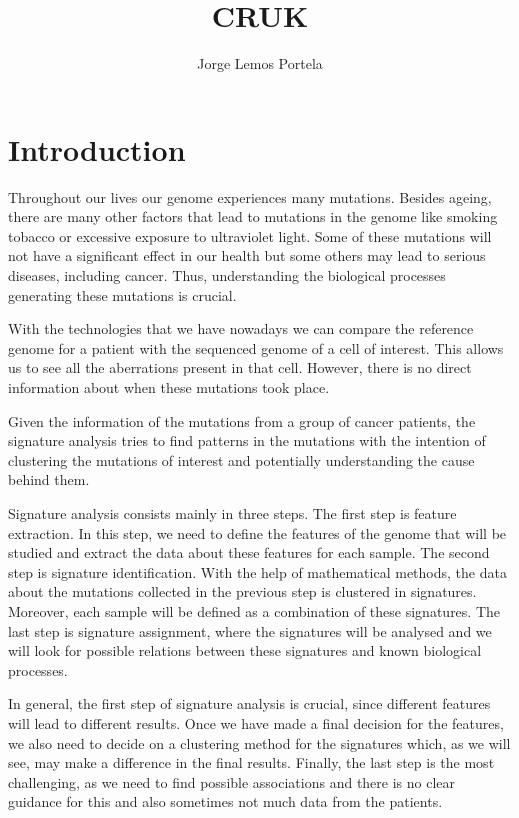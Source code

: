 \documentclass[a4paper]{article}
\title{CRUK}
\author{Jorge Lemos Portela}
\begin{document}
\maketitle

\section{Introduction}
Throughout our lives our genome experiences many mutations. Besides ageing, there are many other factors that lead to mutations in the genome like smoking tobacco or excessive exposure to ultraviolet light. Some of these mutations will not have a significant effect in our health but some others may lead to serious diseases, including cancer. Thus, understanding the biological processes generating these mutations is crucial.\par

With the technologies that we have nowadays we can compare the reference genome for a patient with the sequenced genome of a cell of interest. This allows us to see all the aberrations present in that cell. However, there is no direct information about when these mutations took place.\par
Given the information of the mutations from a group of cancer patients, the signature analysis tries to find patterns in the mutations with the intention of clustering the mutations of interest and potentially understanding the cause behind them. 

Signature analysis consists mainly in three steps. The first step is feature extraction. In this step, we need to define the features of the genome that will be studied and extract the data about these features for each sample. The second step is signature identification. With the help of mathematical methods, the data about the mutations collected in the previous step is clustered in signatures. Moreover, each sample will be defined as a combination of these signatures. The last step is signature assignment, where the signatures will be analysed and we will look for possible relations between these signatures and known biological processes. 

In general, the first step of signature analysis is crucial, since different features will lead to different results. Once we have made a final decision for the features, we also need to decide on a clustering method for the signatures which, as we will see, may make a difference in the final results. Finally, the last step is the most challenging, as we need to find possible associations and there is no clear guidance for this and also sometimes not much data from the patients. 
\end{document}
